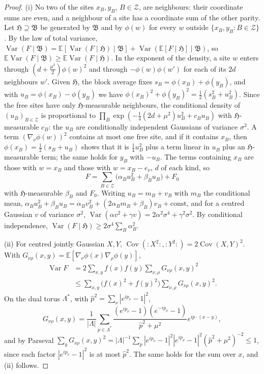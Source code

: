 \documentclass[11pt]{amsart}
\theoremstyle{definition}
\theoremstyle{remark}
\numberwithin{equation}{section}
\newcommand{\E}{\mathbb{E}}
\newcommand{\Cov}{\operatorname{Cov}}
\newcommand{\Var}{\operatorname{Var}}
\begin{document}
\begin{proof}
(i) No two of the sites $x_B,y_B$, $B\in\mathcal Z$, are neighbours: their
coordinate sums are even, and a neighbour of a site has a coordinate sum of
the other parity. Let $\mathfrak H\supseteq\mathfrak B$ be generated by
$\mathfrak B$ and by $\phi(w)$ for every $w$ outside
$\{x_B,y_B:B\in\mathcal Z\}$. By the law of total variance,
$\Var(F\mid\mathfrak B)=\E[\Var(F\mid\mathfrak H)\mid\mathfrak B]
+\Var(\E[F\mid\mathfrak H]\mid\mathfrak B)$, so
$\E\Var(F\mid\mathfrak B)\ge\E\Var(F\mid\mathfrak H)$. In the exponent of the
density, a site $w$ enters through $(d+\frac{\mu^2}2)\phi(w)^2$ and through
$-\phi(w)\phi(w')$ for each of its $2d$ neighbours $w'$. Given $\mathfrak H$,
the block average fixes $s_B=\phi(x_B)+\phi(y_B)$, and with
$u_B=\phi(x_B)-\phi(y_B)$ we have $\phi(x_B)^2+\phi(y_B)^2=\frac12(s_B^2+
u_B^2)$. Since the free sites have only $\mathfrak H$-measurable neighbours,
the conditional density of $(u_B)_{B\in\mathcal Z}$ is proportional to
$\prod_B\exp(-\frac14(2d+\mu^2)u_B^2+c_Bu_B)$ with $\mathfrak H$-measurable
$c_B$: the $u_B$ are conditionally independent Gaussians of variance
$\sigma^2$. A term $(\nabla_\nu\phi(w))^2$ contains at most one free site,
and if it contains $x_B$, then $\phi(x_B)=\frac12(s_B+u_B)$ shows that it is
$\frac14u_B^2$ plus a term linear in $u_B$ plus an $\mathfrak
H$-measurable term; the same holds for $y_B$ with $-u_B$. The terms
containing $x_B$ are those with $w=x_B$ and those with $w=x_B-e_\nu$, $d$ of
each kind, so
\[
F=\sum_{B\in\mathcal Z}\bigl(\alpha_Bu_B^2+\beta_Bu_B\bigr)+F_0
\]
with $\mathfrak H$-measurable $\beta_B$ and $F_0$. Writing
$u_B=m_B+v_B$ with $m_B$ the conditional mean, $\alpha_Bu_B^2+\beta_Bu_B=
\alpha_Bv_B^2+(2\alpha_Bm_B+\beta_B)v_B+\text{const}$, and for a centred
Gaussian $v$ of variance $\sigma^2$, $\Var(\alpha v^2+\gamma v)=2\alpha^2
\sigma^4+\gamma^2\sigma^2$. By conditional independence,
$\Var(F\mid\mathfrak H)\ge2\sigma^4\sum_B\alpha_B^2$.

(ii) For centred jointly Gaussian $X,Y$, $\Cov({:}X^2{:},{:}Y^2{:})=2\Cov(X,Y)^2$.
With $G_{\nu\rho}(x,y)=\E[\nabla_\nu\phi(x)\nabla_\rho\phi(y)]$,
\[
\begin{split}
\Var F&=2\sum_{x,y}f(x)f(y)\sum_{\nu,\rho}G_{\nu\rho}(x,y)^2\\
&\le\sum_{x,y}\bigl(f(x)^2+f(y)^2\bigr)\sum_{\nu,\rho}G_{\nu\rho}(x,y)^2 .
\end{split}
\]
On the dual torus $\Lambda^*$, with $\hat p^2=\sum_\nu|e^{ip_\nu}-1|^2$,
\[
G_{\nu\rho}(x,y)=\frac1{|\Lambda|}\sum_{p\in\Lambda^*}
\frac{(e^{ip_\nu}-1)(e^{-ip_\rho}-1)}{\hat p^2+\mu^2}e^{ip\cdot(x-y)},
\]
and by Parseval
$\sum_yG_{\nu\rho}(x,y)^2=|\Lambda|^{-1}\sum_p|e^{ip_\nu}-1|^2
|e^{ip_\rho}-1|^2(\hat p^2+\mu^2)^{-2}\le1$, since each factor
$|e^{ip_\nu}-1|^2$ is at most $\hat p^2$. The same holds for the sum over
$x$, and (ii) follows.


\end{proof}
\end{document}
